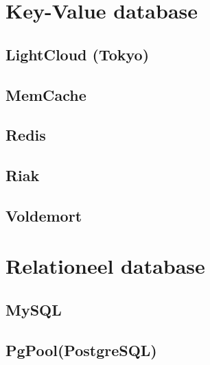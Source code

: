 \section{Key-Value database}

\subsection{LightCloud (Tokyo)}

\subsection{MemCache}

\subsection{Redis}

\subsection{Riak}

\subsection{Voldemort}

\section{Relationeel database}

\subsection{MySQL}

\subsection{PgPool(PostgreSQL)}
